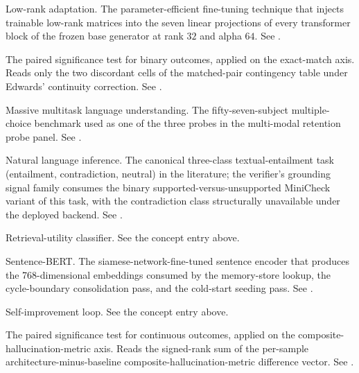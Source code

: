 \begin{description}[style=nextline, leftmargin=0pt, labelindent=0pt, itemsep=6pt, parsep=0pt, font=\bfseries, beginpenalty=10000]
\item[LoRA.] Low-rank adaptation. The parameter-efficient fine-tuning technique that injects trainable low-rank matrices into the seven linear projections of every transformer block of the frozen base generator at rank $32$ and alpha $64$. See .

\item[McNemar test.] The paired significance test for binary outcomes, applied on the exact-match axis. Reads only the two discordant cells of the matched-pair contingency table under Edwards' continuity correction. See .

\item[MMLU.] Massive multitask language understanding. The fifty-seven-subject multiple-choice benchmark used as one of the three probes in the multi-modal retention probe panel. See .

\item[NLI.] Natural language inference. The canonical three-class textual-entailment task (entailment, contradiction, neutral) in the literature; the verifier's grounding signal family consumes the binary supported-versus-unsupported MiniCheck variant of this task, with the contradiction class structurally unavailable under the deployed backend. See .

\item[RUC.] Retrieval-utility classifier. See the concept entry above.

\item[SBERT.] Sentence-BERT. The siamese-network-fine-tuned sentence encoder that produces the 768-dimensional embeddings consumed by the memory-store lookup, the cycle-boundary consolidation pass, and the cold-start seeding pass. See .

\item[SIL.] Self-improvement loop. See the concept entry above.

\item[Wilcoxon signed-rank.] The paired significance test for continuous outcomes, applied on the composite-hallucination-metric axis. Reads the signed-rank sum of the per-sample architecture-minus-baseline composite-hallucination-metric difference vector. See .

\end{description}
